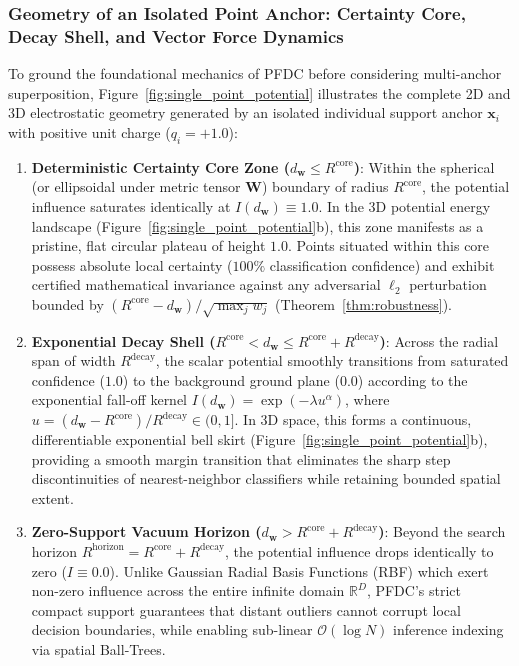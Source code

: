 \documentclass[preprint,review,12pt]{elsarticle}
\begin{document}
\subsubsection{Geometry of an Isolated Point Anchor: Certainty Core, Decay Shell, and Vector Force Dynamics}
To ground the foundational mechanics of PFDC before considering multi-anchor superposition, Figure~\ref{fig:single_point_potential} illustrates the complete 2D and 3D electrostatic geometry generated by an isolated individual support anchor $\mathbf{x}_i$ with positive unit charge ($q_i = +1.0$):
\begin{enumerate}
    \item \textbf{Deterministic Certainty Core Zone ($d_{\mathbf{w}} \le R^{\mathrm{core}}$)}: Within the spherical (or ellipsoidal under metric tensor $\mathbf{W}$) boundary of radius $R^{\mathrm{core}}$, the potential influence saturates identically at $I(d_{\mathbf{w}}) \equiv 1.0$. In the 3D potential energy landscape (Figure~\ref{fig:single_point_potential}b), this zone manifests as a pristine, flat circular plateau of height $1.0$. Points situated within this core possess absolute local certainty ($100\%$ classification confidence) and exhibit certified mathematical invariance against any adversarial $\ell_2$ perturbation bounded by $(R^{\mathrm{core}} - d_{\mathbf{w}})/\sqrt{\max_j w_j}$ (Theorem~\ref{thm:robustness}).
    \item \textbf{Exponential Decay Shell ($R^{\mathrm{core}} < d_{\mathbf{w}} \le R^{\mathrm{core}} + R^{\mathrm{decay}}$)}: Across the radial span of width $R^{\mathrm{decay}}$, the scalar potential smoothly transitions from saturated confidence ($1.0$) to the background ground plane ($0.0$) according to the exponential fall-off kernel $I(d_{\mathbf{w}}) = \exp(-\lambda u^\alpha)$, where $u = (d_{\mathbf{w}} - R^{\mathrm{core}})/R^{\mathrm{decay}} \in (0, 1]$. In 3D space, this forms a continuous, differentiable exponential bell skirt (Figure~\ref{fig:single_point_potential}b), providing a smooth margin transition that eliminates the sharp step discontinuities of nearest-neighbor classifiers while retaining bounded spatial extent.
    \item \textbf{Zero-Support Vacuum Horizon ($d_{\mathbf{w}} > R^{\mathrm{core}} + R^{\mathrm{decay}}$)}: Beyond the search horizon $R^{\mathrm{horizon}} = R^{\mathrm{core}} + R^{\mathrm{decay}}$, the potential influence drops identically to zero ($I \equiv 0.0$). Unlike Gaussian Radial Basis Functions (RBF) which exert non-zero influence across the entire infinite domain $\mathbb{R}^D$, PFDC's strict compact support guarantees that distant outliers cannot corrupt local decision boundaries, while enabling sub-linear $\mathcal{O}(\log N)$ inference indexing via spatial Ball-Trees.

\end{enumerate}
\end{document}
